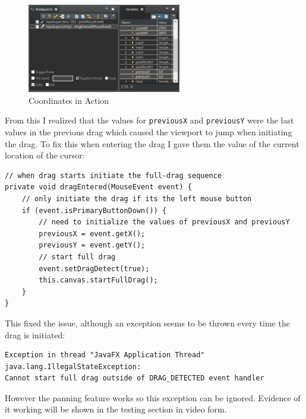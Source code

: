 \documentclass[../../../../main.tex]{subfiles}
\begin{document}
\begin{figure}[H]
	\centering
	\includegraphics[width=0.6\textwidth]{images/debug}
	\caption{Coordinates in Action}
\end{figure}
From this I realized that the values for \texttt{previousX} and \texttt{previousY} were the last values in the previous drag which caused the viewport to jump when initiating the drag. To fix this when entering the drag I gave them the value of the current location of the cursor:
\begin{verbatim}
// when drag starts initiate the full-drag sequence
private void dragEntered(MouseEvent event) {
	// only initiate the drag if its the left mouse button
	if (event.isPrimaryButtonDown()) {
		// need to initialize the values of previousX and previousY
		previousX = event.getX();
		previousY = event.getY();
		// start full drag
		event.setDragDetect(true);
		this.canvas.startFullDrag();
	}
}
\end{verbatim}
This fixed the issue, although an exception seems to be thrown every time the drag is initiated:
\begin{verbatim}
Exception in thread "JavaFX Application Thread" java.lang.IllegalStateException:
Cannot start full drag outside of DRAG_DETECTED event handler
\end{verbatim}
However the panning feature works so this exception can be ignored. Evidence of it working will be shown in the testing section in video form.
\newpage
\end{document}
